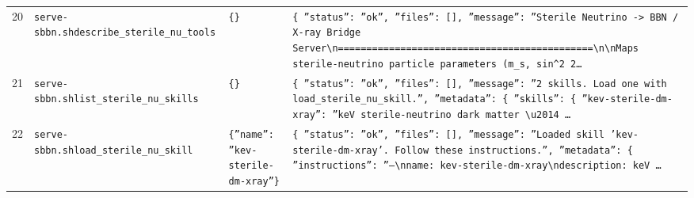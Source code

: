 \documentclass[11pt,a4paper]{article}
\begin{document}
\begin{longtable}{@{}p{}p{}p{}p{}@{}}
20 & \texttt{serve-sbbn.sh}\newline\texttt{describe\_\allowbreak{}sterile\_\allowbreak{}nu\_\allowbreak{}tools} & \texttt{\{\}\allowbreak{}} & \texttt{\{   ''status'':\allowbreak{} ''ok'',\allowbreak{}   ''files'':\allowbreak{} []\allowbreak{},\allowbreak{}   ''message'':\allowbreak{} ''Sterile Neutrino -\textgreater{}\allowbreak{} BBN /\allowbreak{} X-ray Bridge Server\textbackslash{}\allowbreak{}n=\allowbreak{}=\allowbreak{}=\allowbreak{}=\allowbreak{}=\allowbreak{}=\allowbreak{}=\allowbreak{}=\allowbreak{}=\allowbreak{}=\allowbreak{}=\allowbreak{}=\allowbreak{}=\allowbreak{}=\allowbreak{}=\allowbreak{}=\allowbreak{}=\allowbreak{}=\allowbreak{}=\allowbreak{}=\allowbreak{}=\allowbreak{}=\allowbreak{}=\allowbreak{}=\allowbreak{}=\allowbreak{}=\allowbreak{}=\allowbreak{}=\allowbreak{}=\allowbreak{}=\allowbreak{}=\allowbreak{}=\allowbreak{}=\allowbreak{}=\allowbreak{}=\allowbreak{}=\allowbreak{}=\allowbreak{}=\allowbreak{}=\allowbreak{}=\allowbreak{}=\allowbreak{}=\allowbreak{}=\allowbreak{}=\allowbreak{}=\allowbreak{}\textbackslash{}\allowbreak{}n\textbackslash{}\allowbreak{}nMaps sterile-neutrino particle parameters (m\_\allowbreak{}s,\allowbreak{} sin\textasciicircum{}\allowbreak{}2 2\ldots{}\allowbreak{}} \\
21 & \texttt{serve-sbbn.sh}\newline\texttt{list\_\allowbreak{}sterile\_\allowbreak{}nu\_\allowbreak{}skills} & \texttt{\{\}\allowbreak{}} & \texttt{\{   ''status'':\allowbreak{} ''ok'',\allowbreak{}   ''files'':\allowbreak{} []\allowbreak{},\allowbreak{}   ''message'':\allowbreak{} ''2 skills. Load one with load\_\allowbreak{}sterile\_\allowbreak{}nu\_\allowbreak{}skill.'',\allowbreak{}   ''metadata'':\allowbreak{} \{     ''skills'':\allowbreak{} \{       ''kev-sterile-dm-xray'':\allowbreak{} ''keV sterile-neutrino dark matter \textbackslash{}\allowbreak{}u2014 \ldots{}\allowbreak{}} \\
22 & \texttt{serve-sbbn.sh}\newline\texttt{load\_\allowbreak{}sterile\_\allowbreak{}nu\_\allowbreak{}skill} & \texttt{\{''name'':\allowbreak{} ''kev-sterile-dm-xray''\}\allowbreak{}} & \texttt{\{   ''status'':\allowbreak{} ''ok'',\allowbreak{}   ''files'':\allowbreak{} []\allowbreak{},\allowbreak{}   ''message'':\allowbreak{} ''Loaded skill 'kev-sterile-dm-xray'. Follow these instructions.'',\allowbreak{}   ''metadata'':\allowbreak{} \{     ''instructions'':\allowbreak{} ''---\textbackslash{}\allowbreak{}nname:\allowbreak{} kev-sterile-dm-xray\textbackslash{}\allowbreak{}ndescription:\allowbreak{} keV \ldots{}\allowbreak{}} \\

\end{longtable}
\end{document}
